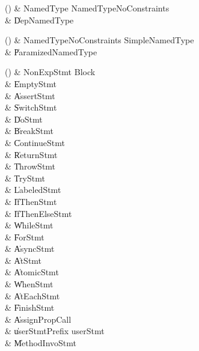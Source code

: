 \begin{bbgrammarappendix}{4.1in}

() & NamedType \label{prod:NamedType}  \: NamedTypeNoConstraints  \\

 &    \| DepNamedType \\

\end{bbgrammarappendix}

\begin{bbgrammarappendix}{2.8in}

() & NamedTypeNoConstraints \label{prod:NamedTypeNoConstraints}  \: SimpleNamedType  \\

 &    \| ParamizedNamedType \\

\end{bbgrammarappendix}

\begin{bbgrammarappendix}{4.0in}

() & NonExpStmt \label{prod:NonExpStmt}  \: Block  \\

 &    \| EmptyStmt \\
 &    \| AssertStmt \\
 &    \| SwitchStmt \\
 &    \| DoStmt \\
 &    \| BreakStmt \\
 &    \| ContinueStmt \\
 &    \| ReturnStmt \\
 &    \| ThrowStmt \\
 &    \| TryStmt \\
 &    \| LabeledStmt \\
 &    \| IfThenStmt \\
 &    \| IfThenElseStmt \\
 &    \| WhileStmt \\
 &    \| ForStmt \\
 &    \| AsyncStmt \\
 &    \| AtStmt \\
 &    \| AtomicStmt \\
 &    \| WhenStmt \\
 &    \| AtEachStmt \\
 &    \| FinishStmt \\
 &    \| AssignPropCall \\
 &    \| userStmtPrefix userStmt \\
 &    \| MethodInvoStmt   \\

\end{bbgrammarappendix}

